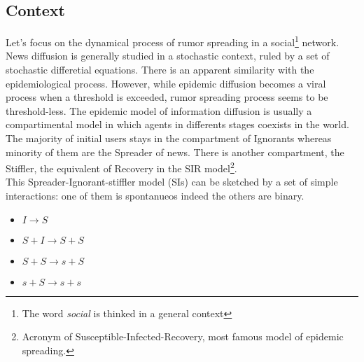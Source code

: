 \documentclass[11pt]{article} %
\begin{document}
\subsection{Context}
Let's focus on the dynamical process of rumor spreading in a social\footnote{The word \textit{ social} is thinked in a general context} network.
 News diffusion is generally studied in a stochastic context, ruled by a set of stochastic differetial equations.
 There is an apparent similarity with the epidemiological process. 
However, while epidemic diffusion becomes a viral process when a threshold is exceeded, rumor spreading process seems to be threshold-less.
 The epidemic model of information diffusion is usually a compartimental model in which agents in differents stages coexists in the world.
The majority of initial users stays in the compartment of Ignorants whereas minority of them are the Spreader of news.
 There is another compartment, the Stiffler, the equivalent of Recovery in the SIR model\footnote{Acronym of Susceptible-Infected-Recovery, most famous model of epidemic spreading.}. 
\\ This Spreader-Ignorant-stiffler model (SIs) can be sketched by a set of simple interactions: one of them is spontanueos indeed the others are binary.
\begin{itemize}
\item$ I \longrightarrow S$
\item $S+I \longrightarrow S + S$

\item $S + S \longrightarrow s + S$

\item $s + S \longrightarrow  s + s$
\end{itemize}
\end{document}
